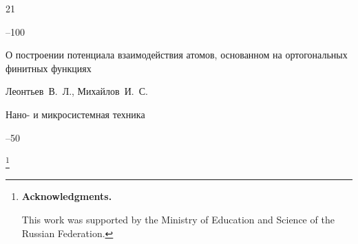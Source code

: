 \begin{thebibliography}{21}



--100














\paper О построении потенциала взаимодействия атомов, основанном на ортогональных финитных функциях 

\by Леонтьев~В.~Л., Михайлов~И.~С.  

\jour Нано- и микросистемная техника 



--50




\end{thebibliography}







\RuDate



\renewcommand{\baselinestretch}{0.87}



\newpage





\makeentitle







\thanks{\textbf{Acknowledgments.} 

This work was supported by the Ministry of Education and Science of the Russian Federation.}







